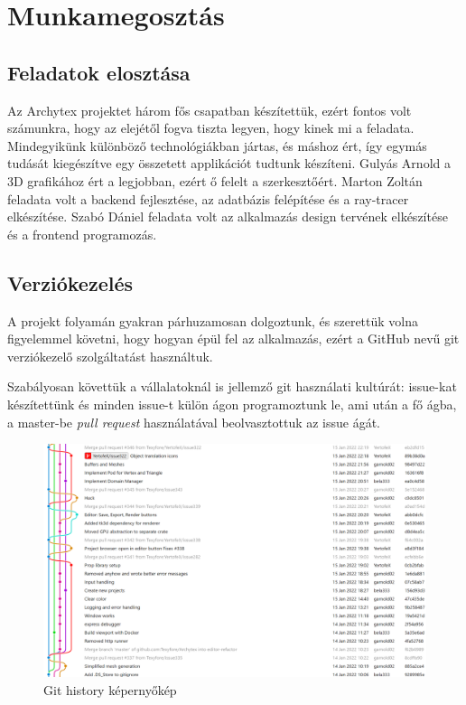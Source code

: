 \section{Munkamegosztás}

\subsection{Feladatok elosztása}
Az Archytex projektet három fős csapatban készítettük, ezért fontos volt számunkra, hogy az elejétől fogva tiszta legyen, hogy kinek mi a feladata. Mindegyikünk különböző technológiákban jártas, és máshoz ért, így egymás tudását kiegészítve egy összetett applikációt tudtunk készíteni. Gulyás Arnold a 3D grafikához ért a legjobban, ezért ő felelt a szerkesztőért. Marton Zoltán feladata volt a backend fejlesztése, az adatbázis felépítése és a ray-tracer elkészítése. Szabó Dániel feladata volt az alkalmazás design tervének elkészítése és a frontend programozás.

\subsection{Verziókezelés}
A projekt folyamán gyakran párhuzamosan dolgoztunk, és szerettük volna figyelemmel követni, hogy hogyan épül fel az alkalmazás, ezért a GitHub nevű git verziókezelő szolgáltatást használtuk.

Szabályosan követtük a vállalatoknál is jellemző git használati kultúrát: issue-kat készítettünk és minden issue-t külön ágon programoztunk le, ami után a fő ágba, a master-be \emph{pull request} használatával beolvasztottuk az issue ágát.

\begin{figure}[h]
  \centering
  \includegraphics[width=.9\textwidth]{parts/developer-documentation/work/images/git-history.png}
  \caption{Git history képernyőkép}
\end{figure}

